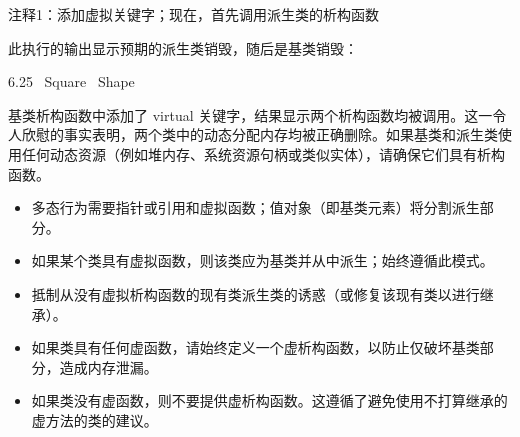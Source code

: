 {\footnotesize
注释1：添加虚拟关键字；现在，首先调用派生类的析构函数
}

此执行的输出显示预期的派生类销毁，随后是基类销毁：

\begin{shell}
6.25
~Square
~Shape
\end{shell}

基类析构函数中添加了 virtual 关键字，结果显示两个析构函数均被调用。这一令人欣慰的事实表明，两个类中的动态分配内存均被正确删除。如果基类和派生类使用任何动态资源（例如堆内存、系统资源句柄或类似实体），请确保它们具有析构函数。


\begin{itemize}
\item
多态行为需要指针或引用和虚拟函数；值对象（即基类元素）将分割派生部分。

\item
如果某个类具有虚拟函数，则该类应为基类并从中派生；始终遵循此模式。

\item
抵制从没有虚拟析构函数的现有类派生类的诱惑（或修复该现有类以进行继承）。

\item
如果类具有任何虚函数，请始终定义一个虚析构函数，以防止仅破坏基类部分，造成内存泄漏。

\item
如果类没有虚函数，则不要提供虚析构函数。这遵循了避免使用不打算继承的虚方法的类的建议。
\end{itemize}








